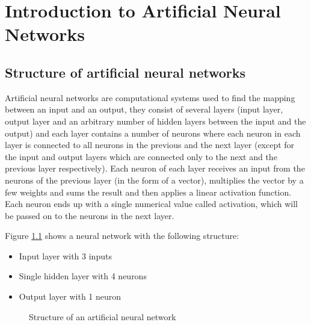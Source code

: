 \chapter{Introduction to Artificial Neural Networks}

\section{Structure of artificial neural networks}
Artificial neural networks are computational systems used to find the mapping between an input and an output, they consist of several layers (input layer, output layer and an arbitrary number of hidden layers between the input and the output) and each layer contains a number of neurons where each neuron in each layer is connected to all neurons in the previous and the next layer (except for the input and output layers which are connected only to the next and the previous layer respectively).
Each neuron of each layer receives an input from the neurons of the previous layer (in the form of a vector), multiplies the vector by a few weights and sums the result and then applies a linear activation function. Each neuron ends up with a single numerical value called activation, which will be passed on to the neurons in the next layer.

Figure \ref{fig:neural-network-structure} shows a neural network with the following structure:

\begin{itemize}
    \item Input layer with 3 inputs
    \item Single hidden layer with 4 neurons
    \item Output layer with 1 neuron
\end{itemize}

\begin{figure}[h]
    \centering
	
    \caption{Structure of an artificial neural network}
    \label{fig:neural-network-structure}
\end{figure}

